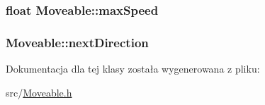\hypertarget{class_moveable_ab36dcef1bdc2dfdf662df044a61f7ba1}{
\subsubsection[{max\-Speed}]{\setlength{\rightskip}{0pt plus 5cm}float Moveable\-::max\-Speed\hspace{0.3cm}{\ttfamily [protected]}}}\label{class_moveable_ab36dcef1bdc2dfdf662df044a61f7ba1}
\hypertarget{class_moveable_af654ea303b092f0e89a9bd81fd3c3ac0}{
\subsubsection[{next\-Direction}]{ Moveable\-::next\-Direction\hspace{0.3cm}{\ttfamily [protected]}}}\label{class_moveable_af654ea303b092f0e89a9bd81fd3c3ac0}


Dokumentacja dla tej klasy została wygenerowana z pliku\-:\begin{DoxyCompactItemize}
\item 
src/\hyperlink{_moveable_8h}{Moveable.\-h}\end{DoxyCompactItemize}
